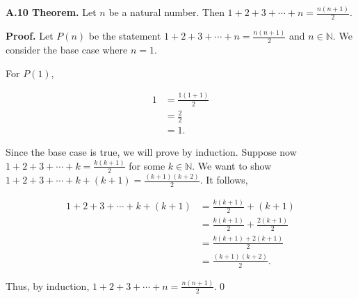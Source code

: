 \documentclass[12pt]{article}
\begin{document}
\noindent\textbf{A.10 Theorem.} Let $n$ be a natural number. Then $1+2+3+\cdots +n= \frac{n(n+1)}{2}$.

\bigskip

\noindent\textbf{Proof.} Let $P(n)$ be the statement $1+2+3+\cdots+n=\frac{n(n+1)}{2}$ and $n\in\mathbb{N}$. We consider the base case where $n=1$. 

\bigskip

\noindent For $P(1)$,

\begin{equation*} 
\begin{align*}
1 &= \frac{1(1+1)}{2} \\
&= \frac{2}{2} \\
&= 1.
\end{align*}
\end{equation*}

\noindent Since the base case is true, we will prove by induction. Suppose now $1+2+3+\cdots+k=\frac{k(k+1)}{2}$ for some $k\in\mathbb{N}$. We want to show $1+2+3+\cdots+k+(k+1)=\frac{(k+1)(k+2)}{2}$. It follows,

\begin{equation*} 
\begin{align*}
1+2+3+\cdots+k+(k+1) &= \frac{k(k+1)}{2}+(k+1) \\
&= \frac{k(k+1)}{2}+\frac{2(k+1)}{2} \\
&= \frac{k(k+1)+2(k+1)}{2} \\
&= \frac{(k+1)(k+2)}{2}.
\end{align*}
\end{equation*}

\noindent Thus, by induction, $1+2+3+\cdots +n= \frac{n(n+1)}{2}$.\qed
\end{document}

